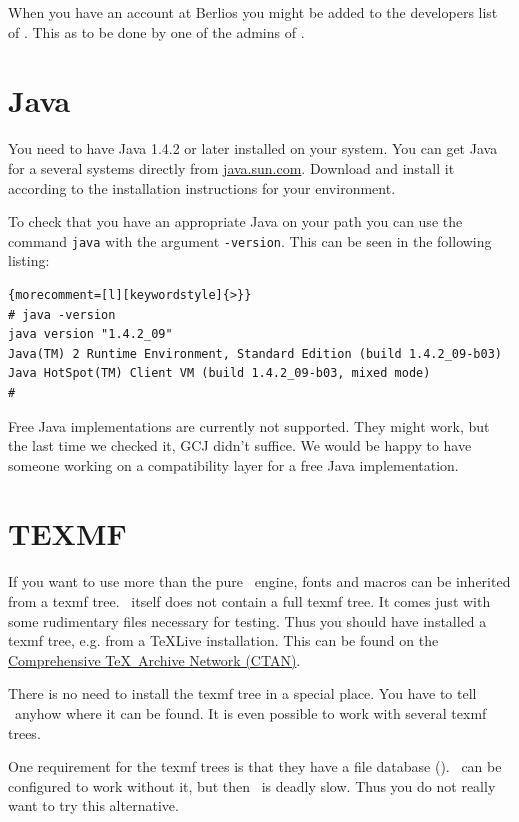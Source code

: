 When you have an account at Berlios you might be added to the
developers list of \ExTeX. This as to be done by one of the admins of
\ExTeX.


\section{Java}

You need to have Java 1.4.2 or later installed on your
system. You can get Java for a several systems directly from
\url{java.sun.com}. Download and install it according to the
installation instructions for your environment.

To check that you have an appropriate Java on your path you can use
the command \texttt{java} with the argument \texttt{-version}. This
can be seen in the following listing:

%
\begin{lstlisting}{morecomment=[l][keywordstyle]{>}}
# java -version
java version "1.4.2_09"
Java(TM) 2 Runtime Environment, Standard Edition (build 1.4.2_09-b03)
Java HotSpot(TM) Client VM (build 1.4.2_09-b03, mixed mode)
#
\end{lstlisting}

Free Java implementations are currently not supported. They might
work, but the last time we checked it, GCJ didn't suffice. We would be
happy to have someone working on a compatibility layer for a free Java
implementation.


\section{TEXMF}

If you want to use more than the pure \ExTeX\ engine, fonts and macros
can be inherited from a texmf tree. \ExTeX\ itself does
not contain a full texmf tree. It comes just with some rudimentary
files necessary for testing. Thus you should have installed a texmf
tree, e.g. from a \TeX Live installation.
This can be found on the \href{http://www.ctan.org}{Comprehensive
  \TeX\ Archive Network (CTAN)}.

There is no need to install the texmf tree in a special place. You
have to tell \ExTeX\ anyhow where it can be found. It is even possible
to work with several texmf trees.

One requirement for the texmf trees is that they have a file database
(). \ExTeX\ can be configured to work without it, but then
\ExTeX\ is deadly slow. Thus you do not really want to try this
alternative.

